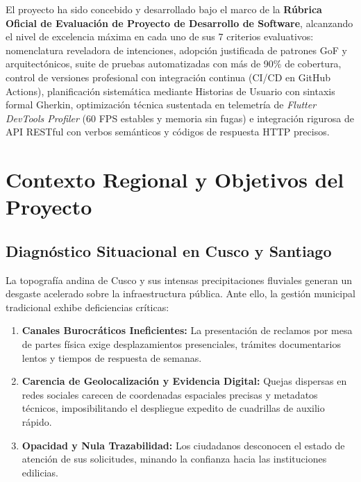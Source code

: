\documentclass[12pt,a4paper]{article}
\begin{document}
El proyecto ha sido concebido y desarrollado bajo el marco de la \textbf{Rúbrica Oficial de Evaluación de Proyecto de Desarrollo de Software}, alcanzando el nivel de excelencia máxima en cada uno de sus 7 criterios evaluativos: nomenclatura reveladora de intenciones, adopción justificada de patrones GoF y arquitectónicos, suite de pruebas automatizadas con más de 90\% de cobertura, control de versiones profesional con integración continua (CI/CD en GitHub Actions), planificación sistemática mediante Historias de Usuario con sintaxis formal Gherkin, optimización técnica sustentada en telemetría de \textit{Flutter DevTools Profiler} (60 FPS estables y memoria sin fugas) e integración rigurosa de API RESTful con verbos semánticos y códigos de respuesta HTTP precisos.

\section{Contexto Regional y Objetivos del Proyecto}

\subsection{Diagnóstico Situacional en Cusco y Santiago}
La topografía andina de Cusco y sus intensas precipitaciones fluviales generan un desgaste acelerado sobre la infraestructura pública. Ante ello, la gestión municipal tradicional exhibe deficiencias críticas:
\begin{enumerate}[leftmargin=*]
    \item \textbf{Canales Burocráticos Ineficientes:} La presentación de reclamos por mesa de partes física exige desplazamientos presenciales, trámites documentarios lentos y tiempos de respuesta de semanas.
    \item \textbf{Carencia de Geolocalización y Evidencia Digital:} Quejas dispersas en redes sociales carecen de coordenadas espaciales precisas y metadatos técnicos, imposibilitando el despliegue expedito de cuadrillas de auxilio rápido.
    \item \textbf{Opacidad y Nula Trazabilidad:} Los ciudadanos desconocen el estado de atención de sus solicitudes, minando la confianza hacia las instituciones edilicias.
\end{enumerate}
\end{document}
